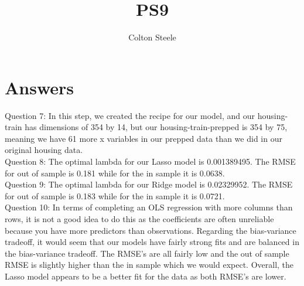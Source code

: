 \documentclass{article}
\title{PS9}
\author{Colton Steele}
\begin{document}
\maketitle


\section{Answers}

Question 7: In this step, we created the recipe for our model, and our housing-train has dimensions of 354 by 14, but our housing-train-prepped is 354 by 75, meaning we have 61 more x variables in our prepped data than we did in our original housing data.\\

Question 8: The optimal lambda for our Lasso model is 0.001389495. The RMSE for out of sample is 0.181 while for the in sample it is 0.0638.\\

Question 9: The optimal lambda for our Ridge model is 0.02329952. The RMSE for out of sample is 0.183 while for the in sample it is 0.0721.\\

Question 10: In terms of completing an OLS regression with more columns than rows, it is not a good idea to do this as the coefficients are often unreliable because you have more predictors than observations. Regarding the bias-variance tradeoff, it would seem that our models have fairly strong fits and are balanced in the bias-variance tradeoff. The RMSE's are all fairly low and the out of sample RMSE is slightly higher than the in sample which we would expect. Overall, the Lasso model appears to be a better fit for the data as both RMSE's are lower. 
\end{document}
